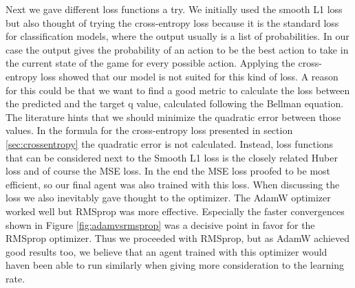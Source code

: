 Next we gave different loss functions a try. We initially used the smooth L1 loss but also thought of trying the cross-entropy loss because it is the standard loss for classification models, where the output usually is a list of probabilities. In our case the output gives the probability of an action to be the best action to take in the current state of the game for every possible action. Applying the cross-entropy loss showed that our model is not suited for this kind of loss. A reason for this could be that we want to find a good metric to calculate the loss between the predicted and the target q value, calculated following the Bellman equation. The literature hints that we should minimize the quadratic error between those values. In the formula for the cross-entropy loss presented in section \ref{sec:crossentropy} the quadratic error is not calculated. Instead, loss functions that can be considered next to the Smooth L1 loss is the closely related Huber loss and of course the MSE loss. In the end the MSE loss proofed to be most efficient, so our final agent was also trained with this loss. When discussing the loss we also inevitably gave thought to the optimizer. The AdamW optimizer worked well but RMSprop was more effective. Especially the faster convergences shown in Figure \ref{fig:adamvsrmsprop} was a decisive point in favor for the RMSprop optimizer. Thus we proceeded with RMSprop, but as AdamW achieved good results too, we believe that an agent trained with this optimizer would haven been able to run similarly when giving more consideration to the learning rate.
